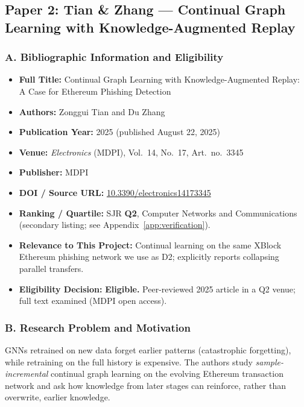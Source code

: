 \documentclass[11pt,a4paper]{article}
\begin{document}
\subsection{Paper 2: Tian \& Zhang --- Continual Graph Learning with Knowledge-Augmented Replay}
\label{sec:p2_kar}

\subsubsection*{A. Bibliographic Information and Eligibility}
\begin{itemize}[leftmargin=*]
    \item \textbf{Full Title:} Continual Graph Learning with Knowledge-Augmented Replay: A Case for Ethereum Phishing Detection
    \item \textbf{Authors:} Zonggui Tian and Du Zhang
    \item \textbf{Publication Year:} 2025 (published August 22, 2025)
    \item \textbf{Venue:} \textit{Electronics} (MDPI), Vol.~14, No.~17, Art.\ no.\ 3345
    \item \textbf{Publisher:} MDPI
    \item \textbf{DOI / Source URL:} \href{https://doi.org/10.3390/electronics14173345}{10.3390/electronics14173345}
    \item \textbf{Ranking / Quartile:} SJR \textbf{Q2}, Computer Networks and Communications (secondary listing; see Appendix~\ref{app:verification}).
    \item \textbf{Relevance to This Project:} Continual learning on the same XBlock Ethereum phishing network we use as D2; explicitly reports collapsing parallel transfers.
    \item \textbf{Eligibility Decision:} \textbf{Eligible.} Peer-reviewed 2025 article in a Q2 venue; full text examined (MDPI open access).
\end{itemize}

\subsubsection*{B. Research Problem and Motivation}
GNNs retrained on new data forget earlier patterns (catastrophic forgetting), while retraining on the full history is expensive. The authors study \emph{sample-incremental} continual graph learning on the evolving Ethereum transaction network and ask how knowledge from later stages can reinforce, rather than overwrite, earlier knowledge.
\end{document}
